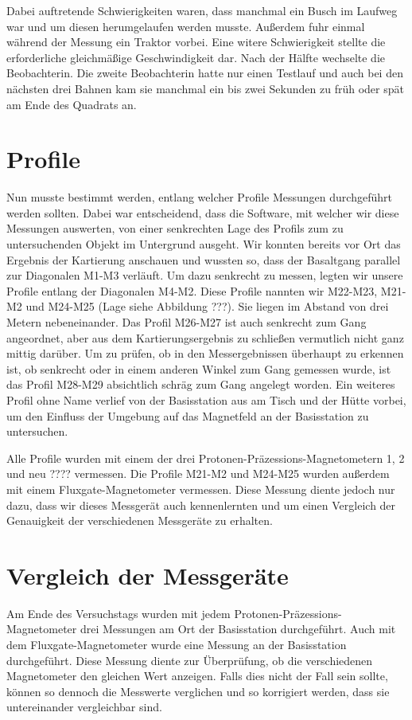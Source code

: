 Dabei auftretende Schwierigkeiten waren, dass manchmal ein Busch im Laufweg war und um diesen herumgelaufen werden musste. Außerdem fuhr einmal während der Messung ein Traktor vorbei. Eine witere Schwierigkeit stellte die erforderliche gleichmäßige Geschwindigkeit dar. Nach der Hälfte wechselte die Beobachterin. Die zweite Beobachterin hatte nur einen Testlauf und auch bei den nächsten drei Bahnen kam sie manchmal ein bis zwei Sekunden zu früh oder spät am Ende des Quadrats an.

\section{Profile}

Nun musste bestimmt werden, entlang welcher Profile Messungen durchgeführt werden sollten. Dabei war entscheidend, dass die Software, mit welcher wir diese Messungen auswerten, von einer senkrechten Lage des Profils zum zu untersuchenden Objekt im Untergrund ausgeht.  Wir konnten bereits vor Ort das Ergebnis der Kartierung anschauen und wussten so, dass der Basaltgang parallel zur Diagonalen M1-M3 verläuft. Um dazu senkrecht zu messen, legten wir unsere Profile entlang der Diagonalen M4-M2. Diese Profile nannten wir M22-M23, M21-M2 und M24-M25 (Lage siehe Abbildung ???). Sie liegen im Abstand von drei Metern nebeneinander. Das Profil M26-M27 ist auch senkrecht zum Gang angeordnet, aber aus dem Kartierungsergebnis zu schließen vermutlich nicht ganz mittig darüber. Um zu prüfen, ob in den Messergebnissen überhaupt zu erkennen ist, ob senkrecht oder in einem anderen Winkel zum Gang gemessen wurde, ist das Profil M28-M29 absichtlich schräg zum Gang angelegt worden. Ein weiteres Profil ohne Name verlief von der Basisstation aus am Tisch und der Hütte vorbei, um den Einfluss der Umgebung auf das Magnetfeld an der Basisstation zu untersuchen.

Alle Profile wurden mit einem der drei Protonen-Präzessions-Magnetometern 1, 2 und neu ???? vermessen. Die Profile M21-M2 und M24-M25 wurden außerdem mit einem Fluxgate-Magnetometer vermessen. Diese Messung diente jedoch nur dazu, dass wir dieses Messgerät auch kennenlernten und um einen Vergleich der Genauigkeit der verschiedenen Messgeräte zu erhalten.

\section{Vergleich der Messgeräte}

Am Ende des Versuchstags wurden mit jedem Protonen-Präzessions-Magnetometer drei Messungen am Ort der Basisstation durchgeführt. Auch mit dem Fluxgate-Magnetometer wurde eine Messung an der Basisstation durchgeführt. Diese Messung diente zur Überprüfung, ob die verschiedenen Magnetometer den gleichen Wert anzeigen. Falls dies nicht der Fall sein sollte, können so dennoch die Messwerte verglichen und so korrigiert werden, dass sie untereinander vergleichbar sind.